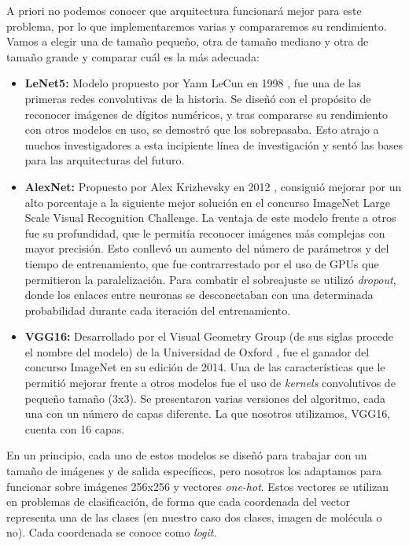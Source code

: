 A priori no podemos conocer que arquitectura funcionará mejor para este problema, por lo que implementaremos varias y compararemos su rendimiento. Vamos a elegir una de tamaño pequeño, otra de tamaño mediano y otra de tamaño grande y comparar cuál es la más adecuada:
\begin{itemize}
    \item \textbf{LeNet5:} Modelo propuesto por Yann LeCun en 1998 \cite{lecun1998gradient}, fue una de las primeras redes convolutivas de la historia. Se diseñó con el propósito de reconocer imágenes de dígitos numéricos, y tras compararse su rendimiento con otros modelos en uso, se demostró que los sobrepasaba. Esto atrajo a muchos investigadores a esta incipiente línea de investigación y sentó las bases para las arquitecturas del futuro.
    \item \textbf{AlexNet:} Propuesto por Alex Krizhevsky en 2012 \cite{krizhevsky2012imagenet}, consiguió mejorar por un alto porcentaje a la siguiente mejor solución en el concurso ImageNet Large Scale Visual Recognition Challenge. La ventaja de este modelo frente a otros fue su profundidad, que le permitía reconocer imágenes más complejas con mayor precisión. Esto conllevó un aumento del número de parámetros y del tiempo de entrenamiento, que fue contrarrestado por el uso de GPUs que permitieron la paralelización. Para combatir el sobreajuste se utilizó \textit{dropout}, donde los enlaces entre neuronas se desconectaban con una determinada probabilidad durante cada iteración del entrenamiento.
    \item \textbf{VGG16:} Desarrollado por el Visual Geometry Group (de sus siglas procede el nombre del modelo) de la Universidad de Oxford \cite{https://doi.org/10.48550/arxiv.1409.1556}, fue el ganador del concurso ImageNet en su edición de 2014. Una de las características que le permitió mejorar frente a otros modelos fue el uso de \textit{kernels} convolutivos de pequeño tamaño (3x3). Se presentaron varias versiones del algoritmo, cada una con un número de capas diferente. La que nosotros utilizamos, VGG16, cuenta con 16 capas.
\end{itemize}

En un principio, cada uno de estos modelos se diseñó para trabajar con un tamaño de imágenes y de salida específicos, pero nosotros los adaptamos para funcionar sobre imágenes 256x256 y vectores \textit{one-hot}. Estos vectores se utilizan en problemas de clasificación, de forma que cada coordenada del vector representa una de las clases (en nuestro caso dos clases, imagen de molécula o no). Cada coordenada se conoce como \textit{logit}.

